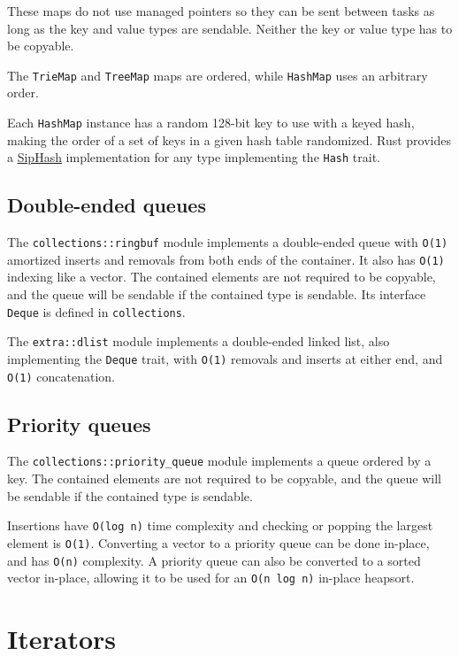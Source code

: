 \documentclass[]{article}
\begin{document}
These maps do not use managed pointers so they can be sent between tasks
as long as the key and value types are sendable. Neither the key or
value type has to be copyable.

The \texttt{TrieMap} and \texttt{TreeMap} maps are ordered, while
\texttt{HashMap} uses an arbitrary order.

Each \texttt{HashMap} instance has a random 128-bit key to use with a
keyed hash, making the order of a set of keys in a given hash table
randomized. Rust provides a \href{https://131002.net/siphash/}{SipHash}
implementation for any type implementing the \texttt{Hash} trait.

\subsection{Double-ended queues}\label{double-ended-queues}

The \texttt{collections::ringbuf} module implements a double-ended queue
with \texttt{O(1)} amortized inserts and removals from both ends of the
container. It also has \texttt{O(1)} indexing like a vector. The
contained elements are not required to be copyable, and the queue will
be sendable if the contained type is sendable. Its interface
\texttt{Deque} is defined in \texttt{collections}.

The \texttt{extra::dlist} module implements a double-ended linked list,
also implementing the \texttt{Deque} trait, with \texttt{O(1)} removals
and inserts at either end, and \texttt{O(1)} concatenation.

\subsection{Priority queues}\label{priority-queues}

The \texttt{collections::priority\_queue} module implements a queue
ordered by a key. The contained elements are not required to be
copyable, and the queue will be sendable if the contained type is
sendable.

Insertions have \texttt{O(log n)} time complexity and checking or
popping the largest element is \texttt{O(1)}. Converting a vector to a
priority queue can be done in-place, and has \texttt{O(n)} complexity. A
priority queue can also be converted to a sorted vector in-place,
allowing it to be used for an \texttt{O(n log n)} in-place heapsort.

\section{Iterators}\label{iterators}
\end{document}
